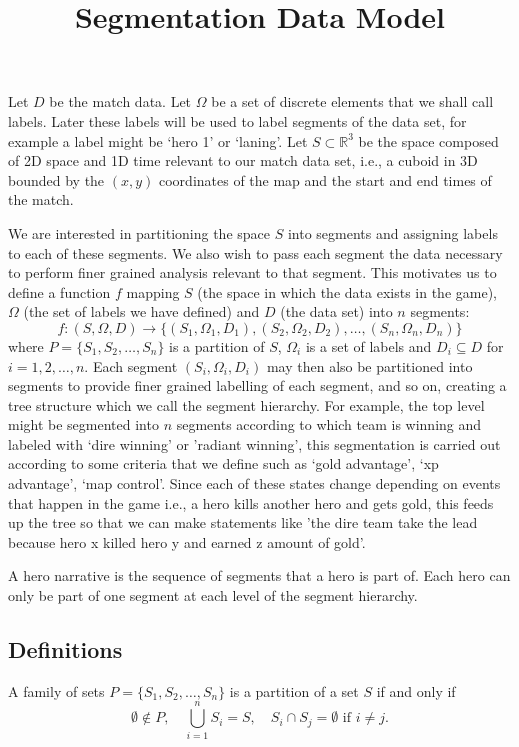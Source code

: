 \documentclass{article}
\begin{document}
\title{Segmentation Data Model}
\maketitle

Let $D$ be the match data. Let $\Omega$ be a set of discrete elements that we shall call labels. Later these labels will be used to label segments of the data set, for example a label might be `hero 1' or `laning'. Let $S\subset\mathbb{R}^{3}$ be the space composed of 2D space and 1D time relevant to our match data set, i.e., a cuboid in 3D bounded by the $(x,y)$ coordinates of the map and the start and end times of the match.

We are interested in partitioning the space $S$ into segments and assigning labels to each of these segments. We also wish to pass each segment the data necessary to perform finer grained analysis relevant to that segment. This motivates us to define a function $f$ mapping $S$ (the space in which the data exists in the game), $\Omega$ (the set of labels we have defined) and $D$ (the data set) into $n$ segments:
\begin{equation*}
f:(S,\Omega,D)\rightarrow \{ (S_{1},\Omega_{1},D_{1}),(S_{2},\Omega_{2},D_{2}),\dots,(S_{n},\Omega_{n},D_{n}) \}
\end{equation*}
where $P = \{S_{1},S_{2},\ldots,S_{n}\}$ is a partition of $S$, $\Omega_{i}$ is a set of labels and $D_{i}\subseteq D$ for $i=1,2,\ldots,n$. Each segment $(S_{i},\Omega_{i},D_{i})$ may then also be partitioned into segments to provide finer grained labelling of each segment, and so on, creating a tree structure which we call the segment hierarchy. For example, the top level might be segmented into $n$ segments according to which team is winning and labeled with `dire winning'  or 'radiant winning', this segmentation is carried out according to some criteria that we define such as `gold advantage', `xp advantage', `map control'. Since each of these states change depending on events that happen in the game i.e., a hero kills  another hero and gets gold, this feeds up the tree so that we can make statements like 'the dire team take the lead because hero x killed hero y and earned z amount of gold'.

A hero narrative is the sequence of segments that a hero is part of. Each hero can only be part of one segment at each level of the segment hierarchy.

%
%

\subsection{Definitions}

A family of sets $P = \{S_{1},S_{2},\ldots,S_{n}\}$ is a partition of a set $S$ if and only if 
\begin{equation*}
\emptyset \not\in P,\quad \bigcup_{i=1}^{n}S_{i} = S,\quad S_{i}\cap S_{j} = \emptyset\text{ if } i\neq j.
\end{equation*}
\end{document}
